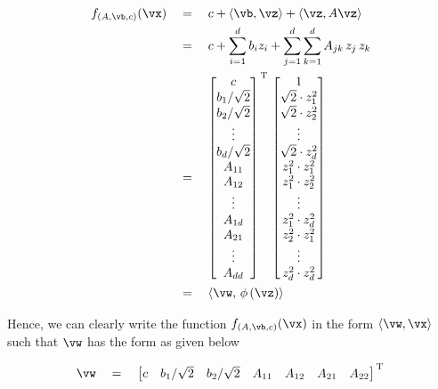 \documentclass{article}
\begin{document}
\begin{mlsolution}
\begin{addmargin}{1.5em}
		\begin{align*}
			f_{(A, \vb, c)}(\vx)	&\eq	c + \ip{\vb}{\vz} + \ip{\vz}{A \vz}	\\
								&\eq	c + \sum_{i = 1}^d b_i z_i + \sum_{j = 1}^d \sum_{k = 1}^d A_{jk} \, z_j \, z_k \\
								&\eq	\brac{\begin{matrix}
											c					\\
											b_1 / \sqrt{2}		\\
											b_2 / \sqrt{2}		\\
											\vdots				\\
											b_d / \sqrt{2}		\\
											A_{11}				\\
											A_{12}				\\
											\vdots				\\
											A_{1d}				\\
											A_{21}				\\
											\vdots				\\
											A_{dd}
										\end{matrix}}^{\mt{T}}
										\brac{\begin{matrix}
											1						\\
											\sqrt{2} \cdot z_1^2	\\
											\sqrt{2} \cdot z_2^2	\\
											\vdots					\\
											\sqrt{2} \cdot z_d^2	\\
											z_1^2 \cdot z_1^2		\\
											z_1^2 \cdot z_2^2		\\
											\vdots					\\
											z_1^2 \cdot z_d^2		\\
											z_2^2 \cdot z_1^2		\\
											\vdots					\\
											z_d^2 \cdot z_d^2
										\end{matrix}} \\
								&\eq	\ip{\vw}{\func{\phi}{\vz}}
		\end{align*} \br%

		Hence, we can clearly write the function $f_{(A, \vb, c)}(\vx)$ in the form $\ip{\vw}{\vx}$ such that $\vw$ has the form as given below

		\begin{align*}
			\vw	\eq	\brac{\begin{matrix}
					c	&	b_1 / \sqrt{2}	&	b_2 / \sqrt{2}	&	A_{11}	&	A_{12}	&	A_{21}	&	A_{22}
			\end{matrix}}^{\mt{T}}
		\end{align*}


\end{addmargin}
\end{mlsolution}
\end{document}
